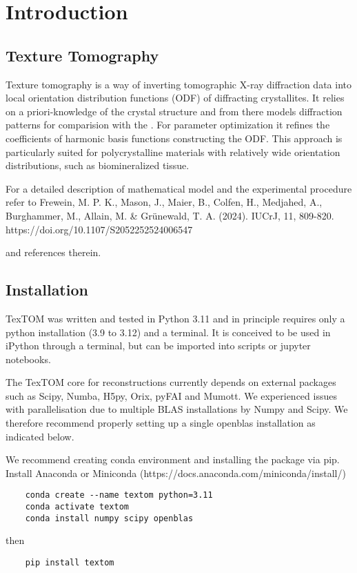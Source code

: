 \section{Introduction}

\subsection{Texture Tomography}
Texture tomography is a way of inverting tomographic X-ray diffraction data into local
orientation distribution functions (ODF) of diffracting crystallites.
It relies on a priori-knowledge of the crystal structure and from there
models diffraction patterns for comparision with the . For parameter optimization it refines
the coefficients of harmonic basis functions constructing the ODF.
This approach is particularly suited for polycrystalline materials
with relatively wide orientation distributions, such as biomineralized tissue.

For a detailed description of mathematical model and the experimental procedure
refer to 
Frewein, M. P. K., Mason, J., Maier, B., Colfen, H., Medjahed, A., Burghammer, 
M., Allain, M. \& Grünewald, T. A. (2024). IUCrJ, 11, 809-820. https://doi.org/10.1107/S2052252524006547

and references therein.

\subsection{Installation}

TexTOM was written and tested in Python 3.11 and in principle requires only a python installation (3.9 to 3.12) and a terminal.
It is conceived to be used in iPython through a terminal, but can be imported into scripts or jupyter notebooks.

The TexTOM core for reconstructions currently depends on external packages such as Scipy, Numba, H5py, Orix, pyFAI and Mumott.
We experienced issues with parallelisation due to multiple BLAS installations by Numpy and Scipy. We therefore recommend
properly setting up a single openblas installation as indicated below.

We recommend creating conda environment and installing the package via pip.
Install Anaconda or Miniconda (https://docs.anaconda.com/miniconda/install/) 
\begin{verbatim}
    conda create --name textom python=3.11
    conda activate textom
    conda install numpy scipy openblas
\end{verbatim}
then
\begin{verbatim}
    pip install textom
\end{verbatim}

